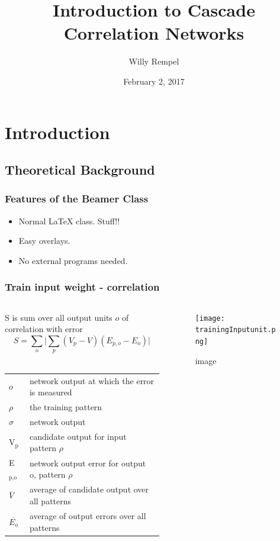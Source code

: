 \documentclass{beamer}
\title{Introduction to Cascade Correlation Networks}
\author{Willy Rempel}
\date{February 2, 2017}
\begin{document}
\frame{\titlepage}

\section[Outline]{}
\frame{\tableofcontents}

\section{Introduction}
\subsection{Theoretical Background}
\frame
{
  \frametitle{Features of the Beamer Class}

  \begin{itemize}
  \item<1-> Normal LaTeX class. Stuff!! \cite[1]{}
  \item<2-> Easy overlays.
  \item<3-> No external programs needed.      
  \end{itemize}
}

\begin{frame}
  \frametitle{Train input weight - correlation}
	\begin{columns}[t]
		\begin{column}[t]{0.5\textwidth}
      \small{S is sum over all output units $\mathit{o}$ of correlation with error} 
      $$ S = \sum_{o} \lvert \sum_{p} (V_{p} - V) (E_{p,o} - E_{o}) \rvert $$
     \\  
      \begin{center}
        \begin{tabular}{ll}
          \(\mathit{o}\) & \tiny{network output at which the error is measured}\\
          \(\rho\) & \tiny{the training pattern}\\
          \(\sigma\) & \tiny{network output} \\
          V\(_{\text{p}}\) & \tiny{candidate output for input pattern} \(\rho\)\\
          E\(_{\text{p,o}}\) & \tiny{network output error for output o, pattern} \(\rho\)\\
          \(\overline{V}\) & \tiny{average of candidate output over all patterns} \\
          \(\overline{E_{o}}\) & \tiny{average of output errors over all patterns} \\
        \end{tabular}
      \end{center}
		\end{column}
		\begin{column}{0.5\textwidth}
      \begin{figure}
        \centering
        \texttt{[image: trainingInputunit.png]}
        \caption{image}
      \end{figure}			
		\end{column}
	\end{columns}
\end{frame}
\end{document}
